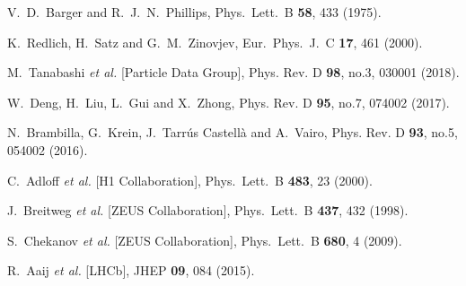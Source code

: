 \documentclass[prd,amsmath,%
twocolumn,floatfix,amssymb, preprintnumbers, linenumbers,nofootinbib, superscriptaddress]{revtex4}
\begin{document}
\begin{thebibliography}{99}
  

  V.~D.~Barger and R.~J.~N.~Phillips,
  Phys.\ Lett.\ B {\bf 58}, 433 (1975).
  

  K.~Redlich, H.~Satz and G.~M.~Zinovjev,
  Eur.\ Phys.\ J.\ C {\bf 17}, 461 (2000).

M.~Tanabashi \textit{et al.} [Particle Data Group],
Phys. Rev. D \textbf{98}, no.3, 030001 (2018). 


W.~Deng, H.~Liu, L.~Gui and X.~Zhong,
Phys. Rev. D \textbf{95}, no.7, 074002 (2017). 

N.~Brambilla, G.~Krein, J.~Tarrús Castellà and A.~Vairo,
Phys. Rev. D \textbf{93}, no.5, 054002 (2016).

 
  C.~Adloff {\it et al.} [H1 Collaboration],
  Phys.\ Lett.\ B {\bf 483}, 23 (2000).


  J.~Breitweg {\it et al.} [ZEUS Collaboration],
  Phys.\ Lett.\ B {\bf 437}, 432 (1998).
 

  S.~Chekanov {\it et al.} [ZEUS Collaboration],
  Phys.\ Lett.\ B {\bf 680}, 4 (2009).
 

R.~Aaij {\it et al.} [LHCb],
JHEP \textbf{09}, 084 (2015). 



\end{thebibliography}
\end{document}
